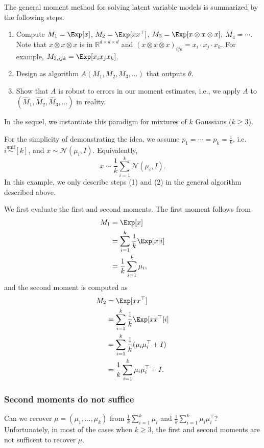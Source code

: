 
The general moment method for solving latent variable models is summarized by the following steps.
\begin{enumerate}
    \item Compute $M_1=\Exp[x]$, $M_2=\Exp[xx^\top]$, $M_3=\Exp[x\otimes x\otimes x],$ $M_4 = \cdots$. Note that $x\otimes x\otimes x$ is in $\mathbb{R}^{d\times d\times d}$ and $(x\otimes x\otimes x)_{ijk}=x_i\cdot x_j\cdot x_k$. For example, $M_{3,ijk}=\Exp[x_ix_jx_k]$.
    \item Design as algorithm $A(M_1, M_2, M_3,\dots)$ that outputs $\theta$.
    \item Show that $A$ is robust to errors in our moment estimates, i.e., we apply $A$ to $(\widehat{M}_1,\widehat{M}_2,\widehat{M}_3,...)$ in reality.
\end{enumerate}
In the sequel, we instantiate this paradigm for mixtures of $k$ Gaussians ($k\geq 3$). 

For the simplicity of demonstrating the idea, we assume $p_1 = \cdots = p_k =\frac{1}{k}$, i.e. $i \stackrel{\text{unif}} \sim[k]$, and $x\sim\mathcal{N}(\mu_i,I)$. Equivalently, 
\begin{equation}
    x\sim\frac{1}{k}\sum_{i=1}^k\mathcal{N}(\mu_i,I).
\end{equation}
In this example, we only describe steps (1) and (2) in the general algorithm described above.  

We first evaluate the first and second moments. The first moment follows from
\begin{align}
    M_1 &=\Exp[x] \\
    &=\sum_{i=1}^k\frac{1}{k}\Exp[x|i] \\
    &=\frac{1}{k}\sum_{i=1}^k\mu_i,
\end{align}
and the second moment is computed as
\begin{align}
    M_2 &= \Exp[xx^\top] \\
    &=\sum_{i=1}^k\frac{1}{k}\Exp[xx^\top|i] \\
    &=\sum_{i=1}^k\frac{1}{k}(\mu_i\mu_i^\top+I) \\
    &=\frac{1}{k}\sum_{i=1}^k\mu_i\mu_i^\top + I.
\end{align}

\subsubsection{Second moments do not suffice}
Can we recover $\mu=(\mu_1,...,\mu_k)$ from $\frac{1}{k}\sum_{i=1}^k\mu_i$ and $\frac{1}{k}\sum_{i=1}^k\mu_i\mu_i^\top$? Unfortunately, in most of the cases when $k\geq 3$, the first and second moments are not sufficent to recover $\mu$. 

